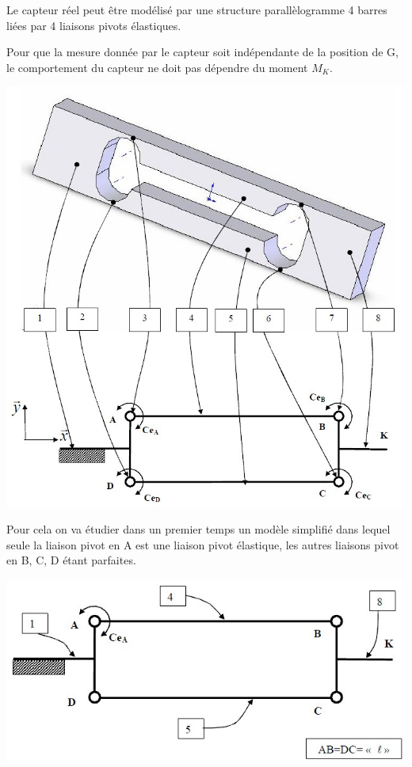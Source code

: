 \begin{minipage}{0.6\linewidth}
Le capteur réel peut être modélisé par une structure parallèlogramme 4 barres liées par 4 liaisons pivots élastiques.

Pour que la mesure donnée par le capteur soit indépendante de la position de G, le comportement du capteur ne doit pas dépendre du moment $M_K$.
\end{minipage}
\hfill
\begin{minipage}{0.37\linewidth}
\centering\includegraphics[width=0.8\linewidth]{img/doseur2.jpg}
\end{minipage}

Pour cela on va étudier dans un premier temps un modèle simplifié dans lequel seule la liaison pivot en A est une liaison pivot élastique, les autres liaisons pivot en B, C, D étant parfaites.

\begin{center}
\centering\includegraphics[width=0.8\linewidth]{img/doseur3.jpg}
\end{center}

